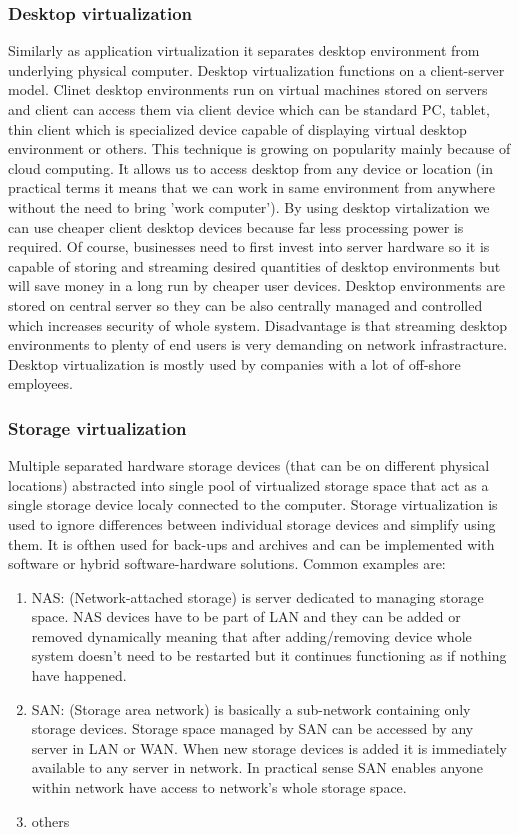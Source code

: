 \begin{enumerate}
\subsubsection{Desktop virtualization}
Similarly as application virtualization it separates desktop environment from underlying physical computer. Desktop virtualization functions on a client-server model. Clinet desktop environments run on virtual machines stored on servers and client can access them via client device which can be standard PC, tablet, thin client which is specialized device capable of displaying virtual desktop environment or others. This technique is growing on popularity mainly because of cloud computing. It allows us to access desktop from any device or location (in practical terms it means that we can work in same environment from anywhere without the need to bring 'work computer'). By using desktop virtalization we can use cheaper client desktop devices because far less processing power is required. Of course, businesses need to first invest into server hardware so it is capable of storing and streaming desired quantities of desktop environments but will save money in a long run by cheaper user devices. Desktop environments are stored on central server so they can be also centrally managed and controlled which increases security of whole system. Disadvantage is that streaming desktop environments to plenty of end users is very demanding on network infrastracture. Desktop virtualization is mostly used by companies with a lot of off-shore employees.

\subsubsection{Storage virtualization}
Multiple separated hardware storage devices (that can be on different physical locations) abstracted into single pool of virtualized storage space that act as a single storage device localy connected to the computer. Storage virtualization is used to ignore differences between individual storage devices and simplify using them. It is ofthen used for back-ups and archives and can be implemented with software or hybrid software-hardware solutions. Common examples are:
\begin{enumerate}
\item NAS: (Network-attached storage) is server dedicated to managing storage space. NAS devices have to be part of LAN and they can be added or removed dynamically meaning that after adding/removing device whole system doesn't need to be restarted but it continues functioning as if nothing have happened.
\item SAN: (Storage area network) is basically a sub-network containing only storage devices. Storage space managed by SAN can be accessed by any server in LAN or WAN. When new storage devices is added it is immediately available to any server in network. In practical sense SAN enables anyone within network have access to network's whole storage space.
\item others
\end{enumerate}



\end{enumerate}
